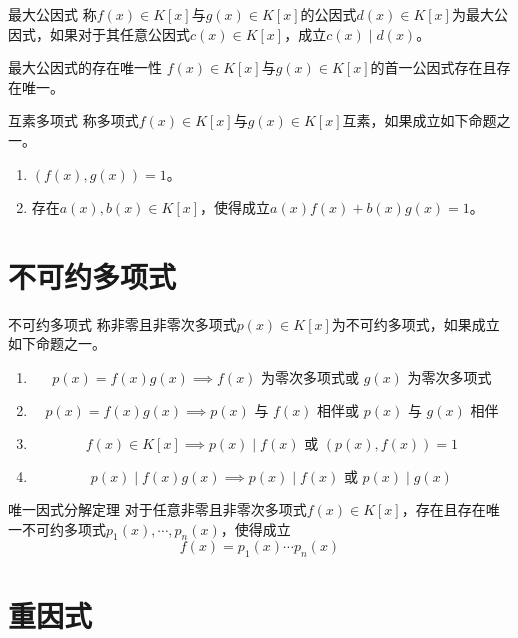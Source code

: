 \documentclass[lang = cn, scheme = chinese, thmcnt = section]{elegantbook}
\begin{document}
\begin{definition}{最大公因式}
	称$f(x)\in K[x]$与$g(x)\in K[x]$的公因式$d(x)\in K[x]$为最大公因式，如果对于其任意公因式$c(x)\in K[x]$，成立$c(x)\mid d(x)$。
\end{definition}

\begin{theorem}{最大公因式的存在唯一性}
	$f(x)\in K[x]$与$g(x)\in K[x]$的首一公因式存在且存在唯一。
\end{theorem}

\begin{definition}{互素多项式}
	称多项式$f(x)\in K[x]$与$g(x)\in K[x]$互素，如果成立如下命题之一。
	\begin{enumerate}
		\item $(f(x),g(x))=1$。
		\item 存在$a(x),b(x)\in K[x]$，使得成立$a(x)f(x)+b(x)g(x)=1$。
	\end{enumerate}
\end{definition}

\section{不可约多项式}

\begin{definition}{不可约多项式}
	称非零且非零次多项式$p(x)\in K[x]$为不可约多项式，如果成立如下命题之一。
	\begin{enumerate}
		\item 
		$$
		p(x)=f(x)g(x)\implies
		f(x)\text{ 为零次多项式或 }g(x)\text{ 为零次多项式}
		$$
		\item 
		$$
		p(x)=f(x)g(x)\implies
		p(x)\text{ 与 }f(x)\text{ 相伴或 }p(x)\text{ 与 }g(x)\text{ 相伴}
		$$
		\item 
		$$
		f(x)\in K[x]\implies
		p(x)\mid f(x)\text{ 或 }(p(x),f(x))=1
		$$
		\item 
		$$
		p(x)\mid f(x)g(x)\implies
		p(x)\mid f(x)\text{ 或 }p(x)\mid g(x)
		$$
	\end{enumerate}
\end{definition}

\begin{theorem}{唯一因式分解定理}
	对于任意非零且非零次多项式$f(x)\in K[x]$，存在且存在唯一不可约多项式$p_1(x),\cdots,p_n(x)$，使得成立
	$$
	f(x)=p_1(x)\cdots p_n(x)
	$$
\end{theorem}

\section{重因式}
\end{document}
